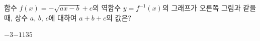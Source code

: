 \noindent\begin{minipage}[t]{0.58\linewidth}\vspace{0pt}\raggedright 함수 $f(x)=-\sqrt{ax-b}+c$의 역함수 $y=f^{-1}(x)$의 그래프가 오른쪽 그림과 같을 때, 상수 $a$, $b$, $c$에 대하여 $a+b+c$의 값은?\end{minipage}\hfill\begin{minipage}[t]{0.4\linewidth}\vspace{0pt}\centering \resizebox{\ifdim\width>\linewidth\linewidth\else\width\fi}{!}{}\end{minipage}\par
\begin{choicesii}{$-3$}{$-1$}{$1$}{$3$}{$5$}\end{choicesii}
